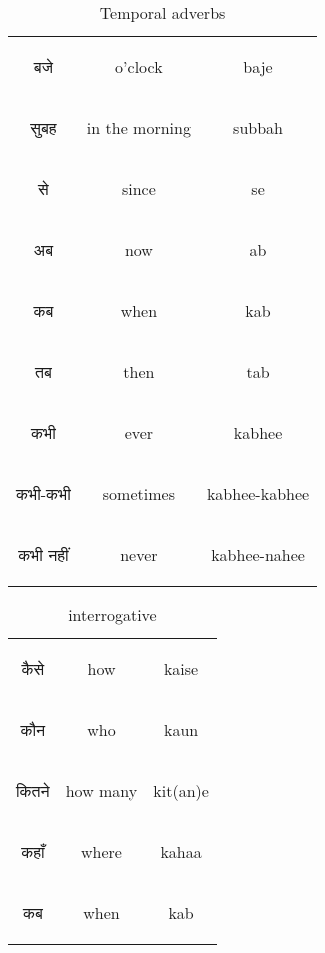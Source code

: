 \begin{table}[H]
    \centering
    \begin{tabular}{c|c|c}
\begin{hindi} बजे \end{hindi} & o'clock & baje \\  
\begin{hindi} सुबह \end{hindi} & in the morning & subbah \\  
\begin{hindi} से \end{hindi} & since & se \\  
\begin{hindi} अब \end{hindi} & now & ab \\  
\begin{hindi} कब \end{hindi} & when & kab \\  
\begin{hindi} तब \end{hindi} & then & tab \\  
\begin{hindi} कभी \end{hindi} & ever & kabhee \\  
\begin{hindi} कभी-कभी \end{hindi} & sometimes & kabhee-kabhee \\  
\begin{hindi} कभी नहीं\end{hindi} & never & kabhee-nahee \\  
    \end{tabular}
    \caption{Temporal adverbs}
    \label{tab:adverbs_temporal}
\end{table}


\begin{table}[H]
    \centering
    \begin{tabular}{c|c|c}        
    \begin{hindi} कैसे \end{hindi} & how & kaise \\
    \begin{hindi} कौन \end{hindi} & who & kaun \\
    \begin{hindi} कितने \end{hindi} & how many & kit(an)e \\
    \begin{hindi} कहाँ \end{hindi} & where & kahaa \\
    \begin{hindi} कब \end{hindi} & when & kab \\
    \end{tabular}    
    \caption{interrogative}
    \label{tab:adverbs_interrogative}
\end{table}

